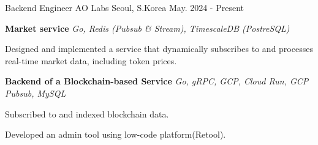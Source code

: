 

\begin{cventries}
\cventry
  {Backend Engineer} %
  {AO Labs} %
  {Seoul, S.Korea} %
  {May. 2024 - Present} %
  {
      \begin{cvitems} %
        \item[] {\textbf{Market service} \hspace{1cm} \textit{Go, Redis (Pubsub \& Stream), TimescaleDB (PostreSQL)}}
        \item {Designed and implemented a service that dynamically subscribes to and processes real-time market data, including token prices.}
        \item[] 
        \item[] {\textbf{Backend of a Blockchain-based Service} \hspace{1cm} \textit{Go, gRPC, GCP, Cloud Run, GCP Pubsub, MySQL}}
        \item {Subscribed to and indexed blockchain data.}
        \item {Developed an admin tool using low-code platform(Retool).}
      \end{cvitems}
  }


\end{cventries}
